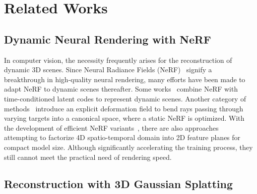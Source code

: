 \documentclass[runningheads]{llncs}
\begin{document}
\section{Related Works}

\subsection{Dynamic Neural Rendering with NeRF}

In computer vision, the necessity frequently arises for the reconstruction of dynamic 3D scenes. 
Since Neural Radiance Fields (NeRF)~\cite{nerf} signify a breakthrough in high-quality neural rendering, many efforts have been made to adapt NeRF to dynamic scenes thereafter.
Some works~\cite{dynerf,nsff} combine NeRF with time-conditioned latent codes to represent dynamic scenes.
Another category of methods~\cite{dnerf,nerfies,hypernerf,song2023nerfplayer} introduce an explicit deformation field to bend rays passing through varying targets into a canonical space, where a static NeRF is optimized.
With the development of efficient NeRF variants~\cite{eg3d,instantngp}, there are also approaches~\cite{kplanes,hexplane,tensor4d} attempting to factorize 4D spatio-temporal domain into 2D feature planes for compact model size. Although significantly accelerating the training process, they still cannot meet the practical need of rendering speed.

\subsection{Reconstruction with 3D Gaussian Splatting}
\end{document}
